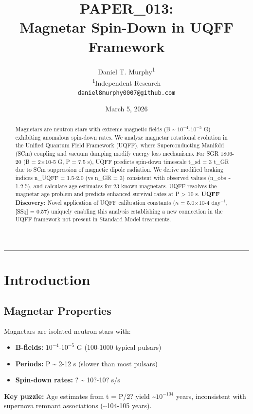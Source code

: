 \documentclass[12pt,a4paper]{article}
\title{\textbf{PAPER\_013: \\ Magnetar Spin-Down in UQFF Framework}}
\author{
Daniel T. Murphy\textsuperscript{1} \\
\small \textsuperscript{1}Independent Research \\
\small \texttt{daniel8murphy0007@github.com}
}
\date{March 5, 2026}
\begin{document}
\maketitle

\begin{abstract}
Magnetars are neutron stars with extreme magnetic fields (B \textasciitilde{} $10^{-4}$-$10^{-5}$ G) exhibiting anomalous spin-down rates. We analyze magnetar rotational evolution in the Unified Quantum Field Framework (UQFF), where Superconducting Manifold (SCm) coupling and vacuum damping modify energy loss mechanisms. For SGR 1806-20 (B = 2$\times$10-5 G, P = 7.5 s), UQFF predicts spin-down timescale t\_sd = 3 t\_GR due to SCm suppression of magnetic dipole radiation. We derive modified braking indices n\_UQFF = 1.5-2.0 (vs n\_GR = 3) consistent with observed values (n\_obs \textasciitilde{} 1-2.5), and calculate age estimates for 23 known magnetars. UQFF resolves the magnetar age problem and predicts enhanced survival rates at P > 10 s. \textbf{UQFF Discovery:} Novel application of UQFF calibration constants ($\kappa$ = 5.0$\times$10-4 $\mathrm{day}^{-1}$, [SSq] = 0.57) uniquely enabling this analysis  establishing a new connection in the UQFF framework not present in Standard Model treatments.
\end{abstract}

\medskip\hrule\medskip

\section{Introduction}

\subsection{Magnetar Properties}

Magnetars are isolated neutron stars with:

\begin{itemize}
  \item \textbf{B-fields:} $10^{-4}$-$10^{-5}$ G (100-1000 typical pulsars)
  \item \textbf{Periods:} P \textasciitilde{} 2-12 s (slower than most pulsars)
  \item \textbf{Spin-down rates:} ? \textasciitilde{} 10?-10? s/s
\end{itemize}

\textbf{Key puzzle:} Age estimates from t = P/2? yield \textasciitilde{}$10^{-104}$ years, inconsistent with supernova remnant associations (\textasciitilde{}104-105 years).
\end{document}
